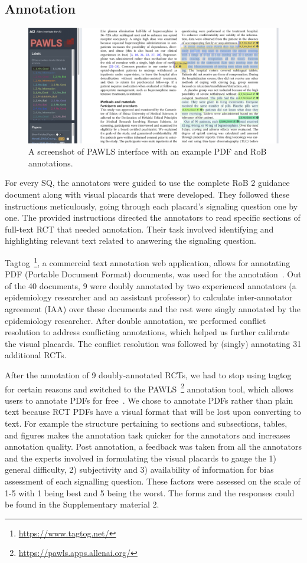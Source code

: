 \documentclass[sn-mathphys,Numbered]{sn-jnl}%
\theoremstyle{thmstyleone}%
\theoremstyle{thmstyletwo}%
\theoremstyle{thmstylethree}%
\begin{document}
\subsection{Annotation}
\label{annotation}
%
%
%
%
\begin{figure}[htb]
    \centering
    \includegraphics[width=0.80\columnwidth]{figures/pawls_layout.png}
    \caption{A screenshot of PAWLS interface with an example PDF and RoB annotations.}
    \label{fig:pawls}
\end{figure}
%
%
%
For every SQ, the annotators were guided to use the complete RoB 2 guidance document along with visual placards that were developed.
They followed these instructions meticulously, going through each placard's signaling question one by one.
The provided instructions directed the annotators to read specific sections of full-text RCT that needed annotation.
Their task involved identifying and highlighting relevant text related to answering the signaling question.



Tagtog~\footnote{\url{https://www.tagtog.net/}}, a commercial text annotation web application, allows for annotating PDF (Portable Document Format) documents, was used for the annotation~\cite{cejuela2014tagtog}.
Out of the 40 documents, 9 were doubly annotated by two experienced annotators (a epidemiology researcher and an assistant professor) to calculate inter-annotator agreement (IAA) over these documents and the rest were singly annotated by the epidemiology researcher.
After double annotation, we performed conflict resolution to address conflicting annotations, which helped us further calibrate the visual placards.
The conflict resolution was followed by (singly) annotating 31 additional RCTs.


After the annotation of 9 doubly-annotated RCTs, we had to stop using tagtog for certain reasons and switched to the PAWLS~\footnote{\url{https://pawls.apps.allenai.org/}} annotation tool, which allows users to annotate PDFs for free~\cite{neumann2021pawls}.
We chose to annotate PDFs rather than plain text because RCT PDFs have a visual format that will be lost upon converting to text. 
For example the structure pertaining to sections and subsections, tables, and figures makes the annotation task quicker for the annotators and increases annotation quality.
Post annotation, a feedback was taken from all the annotators and the experts involved in formulating the visual placards to gauge the 1) general difficulty, 2) subjectivity and 3) availability of information for bias assessment of each signalling question.
These factors were assessed on the scale of 1-5 with 1 being best and 5 being the worst.
The forms and the responses could be found in the Supplementary material 2. %
%
%
%
\end{document}
